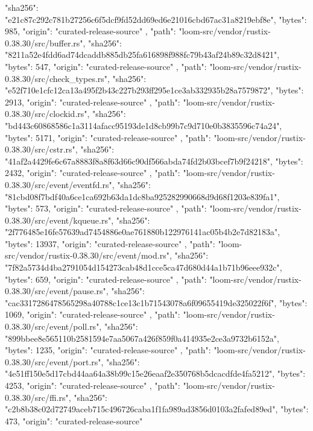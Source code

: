 {{      "sha256": "e21c87c292c781b27256c6f5dcf9fd52dd69ed6e21016cbd67ac31a8219ebf8e",
      "bytes": 985,
      "origin": "curated-release-source"
    },
    {
      "path": "loom-src/vendor/rustix-0.38.30/src/buffer.rs",
      "sha256": "8211a52e4fdd6ad74dcaddb885db25fa616898f988fc79b43af24b89c32d8421",
      "bytes": 547,
      "origin": "curated-release-source"
    },
    {
      "path": "loom-src/vendor/rustix-0.38.30/src/check_types.rs",
      "sha256": "e52f710e1cfc12ca13a495f2b43c227b293ff295e1ce3ab332935b28a7579872",
      "bytes": 2913,
      "origin": "curated-release-source"
    },
    {
      "path": "loom-src/vendor/rustix-0.38.30/src/clockid.rs",
      "sha256": "bd443c60868586c1a3114afacc95193de1d8cb99b7c9d710e0b3835596c74a24",
      "bytes": 5171,
      "origin": "curated-release-source"
    },
    {
      "path": "loom-src/vendor/rustix-0.38.30/src/cstr.rs",
      "sha256": "41af2a4429fe6c67a8883f8a8f63d66c90df566abda74fd2b03bcef7b9f24218",
      "bytes": 2432,
      "origin": "curated-release-source"
    },
    {
      "path": "loom-src/vendor/rustix-0.38.30/src/event/eventfd.rs",
      "sha256": "81cbd08f7bdf40a6ce1ca692b63da1dc8ba925282990668d9d68f1203e839fa1",
      "bytes": 573,
      "origin": "curated-release-source"
    },
    {
      "path": "loom-src/vendor/rustix-0.38.30/src/event/kqueue.rs",
      "sha256": "2f776485e16fe57639ad7454886e0ae761880b122976141ac05b4b2e7d82183a",
      "bytes": 13937,
      "origin": "curated-release-source"
    },
    {
      "path": "loom-src/vendor/rustix-0.38.30/src/event/mod.rs",
      "sha256": "7f82a5734d4ba2791054d154273cab48d1cce5ca47d680d44a1b71b96eee932c",
      "bytes": 659,
      "origin": "curated-release-source"
    },
    {
      "path": "loom-src/vendor/rustix-0.38.30/src/event/pause.rs",
      "sha256": "cac3317286478565298a40788c1ce13c1b71543078a6f09655419de325022f6f",
      "bytes": 1069,
      "origin": "curated-release-source"
    },
    {
      "path": "loom-src/vendor/rustix-0.38.30/src/event/poll.rs",
      "sha256": "899bbee8e565110b2581594e7aa5067a426f859f0a414935e2ce3a9732b6152a",
      "bytes": 1235,
      "origin": "curated-release-source"
    },
    {
      "path": "loom-src/vendor/rustix-0.38.30/src/event/port.rs",
      "sha256": "4e51ff150e5d17cbd44aa64a38b99c15e26eaaf2e350768b5dcacdfde4fa5212",
      "bytes": 4253,
      "origin": "curated-release-source"
    },
    {
      "path": "loom-src/vendor/rustix-0.38.30/src/ffi.rs",
      "sha256": "c2b8b38c02d72749aceb715c496726caba1f1fa989ad3856d0103a2fafed89ed",
      "bytes": 473,
      "origin": "curated-release-source"
}}
